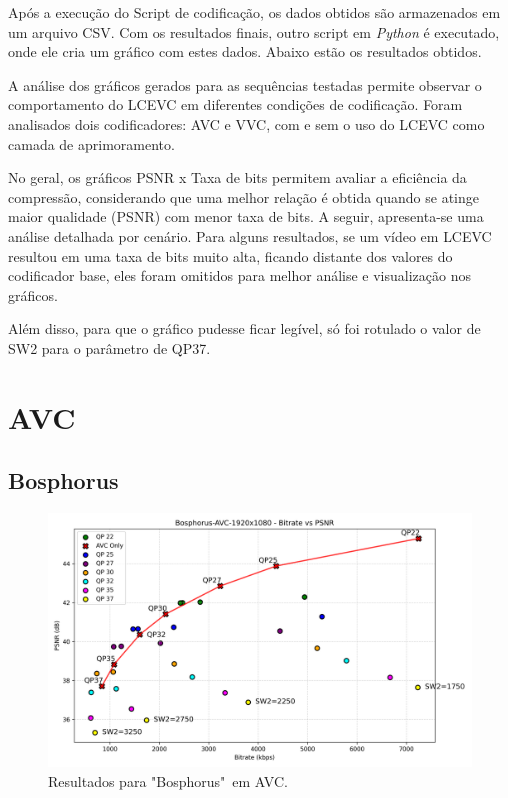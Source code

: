 Após a execução do Script de codificação, os dados obtidos são armazenados
em um arquivo CSV. Com os resultados finais, outro script em \textit{Python} é
executado, onde ele cria um gráfico com estes dados. Abaixo estão os resultados
obtidos.

A análise dos gráficos gerados para as sequências testadas permite observar o comportamento 
do \acrshort{LCEVC} em diferentes condições de codificação. Foram analisados dois
codificadores: \acrshort{AVC} e \acrshort{VVC}, com e sem o uso do \acrshort{LCEVC} 
como camada de aprimoramento.

No geral, os gráficos \acrshort{PSNR} x Taxa de bits permitem avaliar a eficiência da
compressão, considerando que uma melhor relação é obtida quando se atinge maior qualidade
(\acrshort{PSNR}) com menor taxa de bits. A seguir, apresenta-se uma
análise detalhada por cenário. Para alguns resultados, se um vídeo em \acrshort{LCEVC} 
resultou em uma taxa de bits muito alta, ficando distante dos valores
do codificador base, eles foram omitidos para melhor análise e visualização nos gráficos.

Além disso, para que o gráfico pudesse ficar legível, só foi rotulado o valor de SW2 para
o parâmetro de QP37.

\newpage
\section{AVC}

\subsection{Bosphorus}
\begin{figure}[h]
    \centering
    \includegraphics[width=1.0\textwidth]{img/Bosphorus-AVC.png}
    \caption{Resultados para "Bosphorus"\ em \acrshort{AVC}. \cite{uvg_dataset}}
    \label{fig:bosphorus}
\end{figure}

